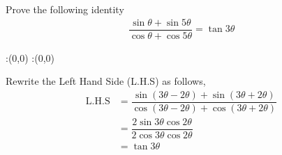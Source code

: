 

\question[3] Prove the following identity
\begin{align}
  \dfrac{\sin\theta+\sin5\theta}{\cos\theta+\cos5\theta} 
    = \tan3\theta \nonumber
\end{align}


\ifprintanswers
  \begin{marginfigure}
      :(0,0)
      :(0,0)
    \figdrawbegin{}
      \figdrawline [100,101]
    \figdrawend
    \figvisu{\figBoxA}{}{%
    }
    \centerline{\box\figBoxA}
  \end{marginfigure}
\fi 

\begin{solution}[\halfpage]
  Rewrite the Left Hand Side (L.H.S) as follows,
  \begin{align}
    \text{L.H.S} &= \dfrac{\sin(3\theta-2\theta)+\sin(3\theta+2\theta)}
                      {\cos(3\theta-2\theta)+\cos(3\theta+2\theta)} \\
                 &= \dfrac{2\sin3\theta\cos2\theta}
                      {2\cos3\theta\cos2\theta} \\
                 &= \tan3\theta
  \end{align}

\end{solution}
